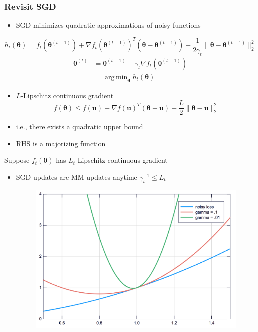 \documentclass{beamer}
\newcommand{\iter}[2]{#1^{(#2)}}
\DeclareMathOperator*{\argmin}{arg\,min}
\begin{document}
\begin{frame}
  \frametitle{Revisit SGD}
  \begin{itemize}
    \item SGD minimizes quadratic approximations of noisy functions
  \end{itemize}
  $$h_t(\bm\theta) = f_t(\iter{\bm\theta}{t-1}) + \nabla f_t(\iter{\bm\theta}{t-1})^T(\bm\theta - \iter{\bm\theta}{t-1}) + \frac{1}{2\gamma_t}\|\bm\theta - \iter{\bm\theta}{t-1}\|_2^2$$
  \vspace{5mm}
  $$\begin{aligned}\iter{\bm\theta}{t} &= \iter{\bm\theta}{t-1} - \gamma_t \nabla f_t(\iter{\bm\theta}{t-1}) \\ &= \argmin_{\bm\theta} h_t(\bm\theta)\end{aligned}$$

\end{frame}
\begin{frame}
  \begin{itemize}
    \item $L$-Lipschitz continuous gradient
    $$f(\bm\theta) \le f(\bm u) + \nabla f(\bm u)^T(\bm\theta - \bm u) + \frac{L}{2}\|\bm\theta - \bm u\|_2^2$$
    \item i.e., there exists a quadratic upper bound
    \item RHS is a majorizing function
  \end{itemize}
\end{frame}
\begin{frame}
  Suppose $f_t(\bm\theta)$ has $L_t$-Lipschitz continuous gradient
  \begin{itemize}
    \item SGD updates are MM updates anytime $\gamma_t^{-1} \le L_t$
    \begin{figure}
      \includegraphics[width=.7\textwidth]{figures/quadraticupperbound.png}
    \end{figure}
  \end{itemize}
\end{frame}
\end{document}
